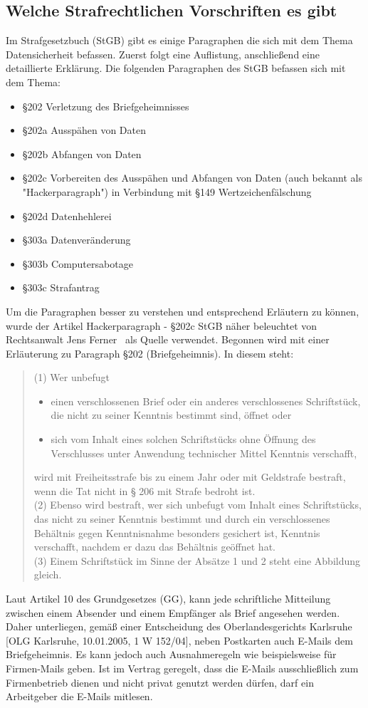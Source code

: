 \documentclass[10pt,a4paper]{article}
\begin{document}
\subsection*{Welche Strafrechtlichen Vorschriften es gibt}
Im Strafgesetzbuch (StGB) gibt es einige Paragraphen die sich mit dem Thema Datensicherheit befassen. Zuerst folgt eine Auflistung, anschließend eine detaillierte Erklärung. Die folgenden Paragraphen des StGB befassen sich mit dem Thema:
\begin{itemize}
	\item §202 Verletzung des Briefgeheimnisses
	\item §202a Ausspähen von Daten
	\item §202b Abfangen von Daten
	\item §202c Vorbereiten des Ausspähen und Abfangen von Daten (auch bekannt als "Hackerparagraph") in Verbindung mit §149 Wertzeichenfälschung
	\item §202d Datenhehlerei
	\item §303a Datenveränderung
	\item §303b Computersabotage
	\item §303c Strafantrag 
\end{itemize}
Um die Paragraphen besser zu verstehen und entsprechend Erläutern zu können, wurde der Artikel \glqq Hackerparagraph - §202c StGB näher beleuchtet\grqq{} von Rechtsanwalt Jens Ferner~\cite{InternetStrafrecht} als Quelle verwendet. Begonnen wird mit einer Erläuterung zu Paragraph §202 (Briefgeheimnis). In diesem steht:
\begin{quote}
(1) Wer unbefugt
\begin{itemize}
	\item[1.] einen verschlossenen Brief oder ein anderes verschlossenes Schriftstück, die nicht zu seiner Kenntnis bestimmt sind, öffnet oder
	\item[2.] sich vom Inhalt eines solchen Schriftstücks ohne Öffnung des Verschlusses unter Anwendung technischer Mittel Kenntnis verschafft,
\end{itemize}
wird mit Freiheitsstrafe bis zu einem Jahr oder mit Geldstrafe bestraft, wenn die Tat nicht in § 206 mit Strafe bedroht ist.\\
(2) Ebenso wird bestraft, wer sich unbefugt vom Inhalt eines Schriftstücks, das nicht zu seiner Kenntnis bestimmt und durch ein verschlossenes Behältnis gegen Kenntnisnahme besonders gesichert ist, Kenntnis verschafft, nachdem er dazu das Behältnis geöffnet hat.\\
(3) Einem Schriftstück im Sinne der Absätze 1 und 2 steht eine Abbildung gleich.
\end{quote}
Laut Artikel 10 des Grundgesetzes (GG), kann jede schriftliche Mitteilung zwischen einem Absender und einem Empfänger als Brief angesehen werden. Daher unterliegen, gemäß einer Entscheidung des Oberlandesgerichts Karlsruhe [OLG Karlsruhe, 10.01.2005, 1 W 152/04], neben Postkarten auch E-Mails dem Briefgeheimnis. Es kann jedoch auch Ausnahmeregeln wie beispielsweise für Firmen-Mails geben. Ist im Vertrag geregelt, dass die E-Mails ausschließlich zum Firmenbetrieb dienen und nicht privat genutzt werden dürfen, darf ein Arbeitgeber die E-Mails mitlesen.
\end{document}

